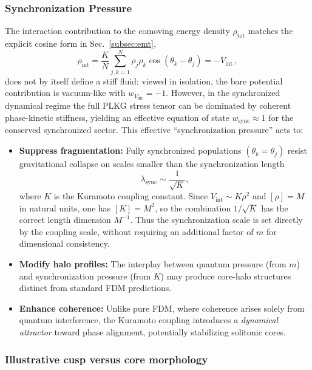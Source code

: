 \subsubsection{Synchronization Pressure}
The interaction contribution to the comoving energy density $\rho_{\mathrm{tot}}$ matches the explicit cosine form in Sec.~\ref{subsec:emt},
\begin{equation}
\rho_{\text{int}} = \frac{K}{N}\sum_{j,k=1}^N \rho_j\rho_k\cos(\theta_k-\theta_j) = -V_{\mathrm{int}}\,,
\end{equation}
does not by itself define a stiff fluid: viewed in isolation, the bare potential contribution is vacuum-like with $w_{V_{\text{int}}}=-1$. However, in the synchronized dynamical regime the full PLKG stress tensor can be dominated by coherent phase-kinetic stiffness, yielding an effective equation of state $w_{\text{sync}} \approx 1$ for the conserved synchronized sector. This effective ``synchronization pressure'' acts to:
\begin{itemize}
    \item \textbf{Suppress fragmentation:} Fully synchronized populations $(\theta_k = \theta_j)$ resist gravitational collapse on scales smaller than the synchronization length
    \begin{equation}
    \lambda_{\text{sync}} \sim \frac{1}{\sqrt{K}},
    \label{eq:lambda_sync}
    \end{equation}
    where $K$ is the Kuramoto coupling constant. Since $V_{\text{int}} \sim K\rho^2$ and $[\rho]=M$ in natural units, one has $[K]=M^2$, so the combination $1/\sqrt{K}$ has the correct length dimension $M^{-1}$. Thus the synchronization scale is set directly by the coupling scale, without requiring an additional factor of $m$ for dimensional consistency.
    \item \textbf{Modify halo profiles:} The interplay between quantum pressure (from $m$) and synchronization pressure (from $K$) may produce core-halo structures distinct from standard FDM predictions.
    \item \textbf{Enhance coherence:} Unlike pure FDM, where coherence arises solely from quantum interference, the Kuramoto coupling introduces a \emph{dynamical attractor} toward phase alignment, potentially stabilizing solitonic cores.
\end{itemize}

\subsubsection{Illustrative cusp versus core morphology}
\label{subsubsec:cusp-core-cartoon}

